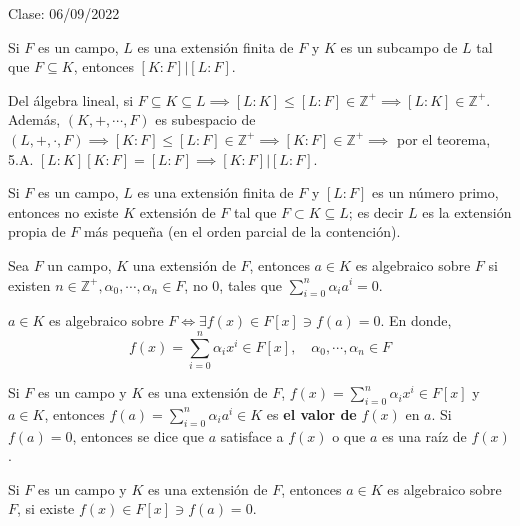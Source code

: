 Clase: 06/09/2022

\begin{corolario}
    Si $F$ es un campo, $L$ es una extensión finita de $F$ y $K$ es un subcampo de $L$ tal que $F\subseteq K$, entonces $[K:F]|[L:F]$.
    \begin{dem}
        Del álgebra lineal, si $F\subseteq K\subseteq L\implies [L:K]\leq [L:F]\in\mathbb{Z}^+\implies [L:K]\in\mathbb{Z}^+$. Además, $(K,+,\cdots,F)$ es subespacio de $(L,+,\cdot, F)\implies [K:F]\leq [L:F]\in \mathbb{Z}^+\implies [K:F]\in\mathbb{Z}^+\implies$ por el teorema, 5.A. $[L:K][K:F]=[L:F]\implies [K:F]|[L:F]$.
    \end{dem}
\end{corolario}

\begin{corolario}
    Si $F$ es un campo, $L$ es una extensión finita de $F$ y $[L:F]$ es un número primo, entonces no existe  $K$ extensión de $F$ tal que $F\subset K\subseteq L$; es decir $L$ es la extensión propia de $F$ más pequeña (en el orden parcial de la contención).
\end{corolario}

\begin{definicion}
    Sea $F$ un campo, $K$ una extensión de $F$, entonces $a\in K$ es algebraico sobre $F$ si existen $n\in\mathbb{Z}^+,\alpha_0,\cdots,\alpha_n\in F$, no 0, tales que $\sum_{i=0}^n\alpha_ia^i=0$.
    \begin{cajita}
        $a\in K$ es algebraico sobre $F\iff \exists f(x)\in F[x]\ni f(a)=0$. En donde, 
        $$f(x)=\sum_{i=0}^n \alpha_ix^i\in F[x],\quad \alpha_0,\cdots, \alpha_n\in F$$
    \end{cajita}  
\end{definicion}

\begin{definicion}
    Si $F$ es un campo y $K$ es una extensión de $F$, $f(x)=\sum_{i=0}^n\alpha_ix^i \in F[x]$ y $a\in K$, entonces $f(a)=\sum_{i=0}^n\alpha_ia^i\in K$ es \textbf{el valor de } $f(x)$ en $a$. Si $f(a)=0$, entonces se dice que $a$ satisface a $f(x)$ o que $a$ es una raíz de $f(x)$.
\end{definicion}

\begin{prop}
    Si $F$ es un campo y $K$ es una extensión de $F$, entonces $a\in K$ es algebraico sobre $F$, si existe $f(x)\in F[x]\ni f(a)=0$.
\end{prop}

